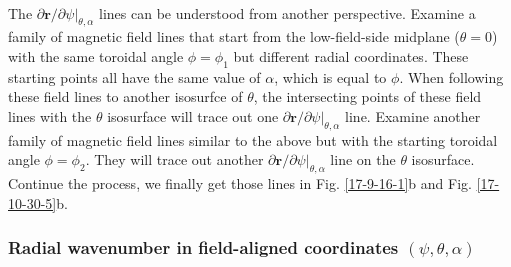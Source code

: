 \documentclass{article}
\newcommand{\nobracket}{}
\begin{document}
\

The $\partial \mathbf{r}/ \partial \psi |_{\theta, \alpha} \nobracket$ lines
can be understood from another perspective. Examine a family of magnetic field
lines that start from the low-field-side midplane ($\theta = 0$) with the same
toroidal angle $\phi = \phi_1$ but different radial coordinates. These
starting points all have the same value of $\alpha$, which is equal to $\phi$.
When following these field lines to another isosurfce of $\theta$, the
intersecting points of these field lines with the $\theta$ isosurface will
trace out one $\partial \mathbf{r}/ \partial \psi |_{\theta, \alpha}
\nobracket$ line. Examine another family of magnetic field lines similar to
the above but with the starting toroidal angle $\phi = \phi_2$. They will
trace out another $\partial \mathbf{r}/ \partial \psi |_{\theta, \alpha}
\nobracket$ line on the $\theta$ isosurface. Continue the process, we finally
get those lines in Fig. \ref{17-9-16-1}b and Fig. \ref{17-10-30-5}b.

\subsubsection{Radial wavenumber in field-aligned coordinates $(\psi, \theta,
\alpha)$}
\end{document}
